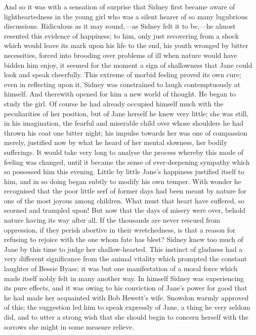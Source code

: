 And so it was with a sensation of surprise that Sidney first became
aware of lightheartedness in the young girl who was a silent hearer of
so many lugubrious discussions. Ridiculous as it may sound,---as Sidney
felt it to be,---he almost resented this evidence of happiness; to him,
only just recovering from a shock which would leave its mark upon his
life to the end, his youth wronged by bitter necessities, forced into
brooding over problems of ill when nature would have bidden him enjoy,
it seemed for the moment a sign of shallowness that Jane could look and
speak cheerfully. This extreme of morbid feeling proved its own cure;
{}even in reflecting upon it, Sidney was constrained to laugh
contemptuously at himself. And therewith opened for him a new world of
thought. He began to study the girl. Of course he had already occupied
himself much with the peculiarities of her position, but of Jane herself
he knew very little; she was still, in his imagination, the fearful and
miserable child over whose shoulders he had thrown his coat one bitter
night; his impulse towards her was one of compassion merely, justified
now by what he heard of her mental slowness, her bodily sufferings. It
would take very long to analyse the process whereby this mode of feeling
was changed, until it became the sense of ever-deepening sympathy which
so possessed him this evening. Little by little Jane's happiness
justified itself to him, and in so doing began subtly to modify his own
temper. With wonder he recognised that the poor little serf of former
days had been meant by nature for one of the most joyous among children.
What must that heart have suffered, so scorned and trampled {}upon! But
now that the days of misery were over, behold nature having its way
after all. If the thousands are never rescued from oppression, if they
perish abortive in their wretchedness, is that a reason for refusing to
rejoice with the one whom fate has blest? Sidney knew too much of Jane
by this time to judge her shallow-hearted. This instinct of gladness had
a very different significance from the animal vitality which prompted
the constant laughter of Bessie Byass; it was but one manifestation of a
moral force which made itself nobly felt in many another way. In himself
Sidney was experiencing its pure effects, and it was owing to his
conviction of Jane's power for good that he had made her acquainted with
Bob Hewett's wife. Snowdon warmly approved of this; the suggestion led
him to speak expressly of Jane, a thing he very seldom did, and to utter
a strong wish that she should begin to concern herself with the sorrows
she might in some measure relieve.

